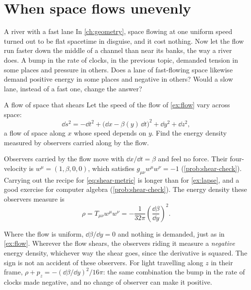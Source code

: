 \section{When space flows unevenly}\label{sec:shear}

\begin{thought}{A river with a fast lane}
In \cref{ch:geometry}, space flowing at one uniform speed turned out to be flat
spacetime in disguise, and it cost nothing. Now let the flow run faster down
the middle of a channel than near its banks, the way a river does. A bump in
the rate of clocks, in the previous topic, demanded tension in some places and
pressure in others. Does a lane of fast-flowing space likewise demand positive
energy in some places and negative in others? Would a slow lane, instead of a
fast one, change the answer?
\end{thought}

\begin{example}[label=ex:shear]{A flow of space that shears}
Let the speed of the flow of \cref{ex:flow} vary across space:
\begin{equation}
  \dd s^{2} = -\dd t^{2} + \bigl(\dd x - \beta(y)\,\dd t\bigr)^{2} + \dd y^{2} + \dd z^{2},
  \label{eq:shear-metric}
\end{equation}
a flow of space along $x$ whose speed depends on $y$. Find the energy density
measured by observers carried along by the flow.

\solution Observers carried by the flow move with $\dd x/\dd t = \beta$ and
feel no force. Their four-velocity is $w^{\mu} = (1, \beta, 0, 0)$, which
satisfies $g_{\mu\nu}w^{\mu}w^{\nu} = -1$ (\cref{prob:shear-check}). Carrying
out the recipe for \cref{eq:shear-metric} is longer than for \cref{ex:lapse},
and a good exercise for computer algebra (\cref{prob:shear-check}). The energy
density these observers measure is
\begin{equation}
  \rho = T_{\mu\nu}w^{\mu}w^{\nu} = -\frac{1}{32\pi}\left(\frac{\dd\beta}{\dd y}\right)^{2}.
  \label{eq:shear-density}
\end{equation}

\discussion Where the flow is uniform, $\dd\beta/\dd y = 0$ and nothing is
demanded, just as in \cref{ex:flow}. Wherever the flow shears, the observers
riding it measure a \emph{negative} energy density, whichever way the shear
goes, since the derivative is squared. The sign is not an accident of these
observers. For light travelling along $z$ in their frame,
$\rho + p_{z} = -(\dd\beta/\dd y)^{2}/16\pi$: the same combination the bump in
the rate of clocks made negative, and no change of observer can make it
positive.
\end{example}

